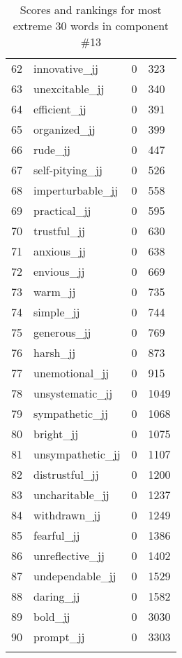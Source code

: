 \begin{longtable}[!htbp]{| rlr@{.}l |}
    62 & innovative\_jj & 0 & 323 \\
    63 & unexcitable\_jj & 0 & 340 \\
    64 & efficient\_jj & 0 & 391 \\
    65 & organized\_jj & 0 & 399 \\
    66 & rude\_jj & 0 & 447 \\
    67 & self-pitying\_jj & 0 & 526 \\
    68 & imperturbable\_jj & 0 & 558 \\
    69 & practical\_jj & 0 & 595 \\
    70 & trustful\_jj & 0 & 630 \\
    71 & anxious\_jj & 0 & 638 \\
    72 & envious\_jj & 0 & 669 \\
    73 & warm\_jj & 0 & 735 \\
    74 & simple\_jj & 0 & 744 \\
    75 & generous\_jj & 0 & 769 \\
    76 & harsh\_jj & 0 & 873 \\
    77 & unemotional\_jj & 0 & 915 \\
    78 & unsystematic\_jj & 0 & 1049 \\
    79 & sympathetic\_jj & 0 & 1068 \\
    80 & bright\_jj & 0 & 1075 \\
    81 & unsympathetic\_jj & 0 & 1107 \\
    82 & distrustful\_jj & 0 & 1200 \\
    83 & uncharitable\_jj & 0 & 1237 \\
    84 & withdrawn\_jj & 0 & 1249 \\
    85 & fearful\_jj & 0 & 1386 \\
    86 & unreflective\_jj & 0 & 1402 \\
    87 & undependable\_jj & 0 & 1529 \\
    88 & daring\_jj & 0 & 1582 \\
    89 & bold\_jj & 0 & 3030 \\
    90 & prompt\_jj & 0 & 3303 \\
    \hline
    \caption{Scores and rankings for most extreme 30 words in component \#13} \\
\end{longtable}
